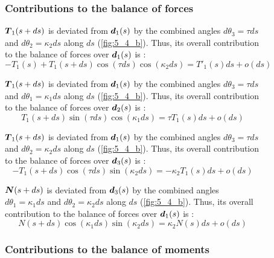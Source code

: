\begin{figure}[p]
	\begin{fullpage}
	\subsubsection{Contributions to the balance of forces}
	\vspace{10pt}
	
	$\boldsymbol{T}_1(s+ds)$ is deviated from $\boldsymbol{d}_1(s)$ by the combined angles $d\theta_3 = \tau ds$ and $d\theta_2 = \kappa_2 ds$ along $ds$ (\cref{fig:5_4_b}). Thus, its overall contribution to the balance of forces over $\boldsymbol{d}_1(s)$ is : 
	\begin{equation*}
		-T_1(s) + T_1(s+ds) \cos(\tau ds) \cos(\kappa_2 ds) = T'_1 (s) ds + o(ds)
	\end{equation*}
	
	$\boldsymbol{T}_1(s+ds)$ is deviated from $\boldsymbol{d}_1(s)$ by the combined angles $d\theta_3 = \tau ds$ and $d\theta_1 = \kappa_1 ds$ along $ds$ (\cref{fig:5_4_b}). Thus, its overall contribution to the balance of forces over $\boldsymbol{d}_2(s)$ is : 
	\begin{equation*}
		T_1(s+ds) \sin(\tau ds) \cos(\kappa_1 ds) = \tau T_1 (s) ds + o(ds)
	\end{equation*}	
	
	$\boldsymbol{T}_1(s+ds)$ is deviated from $\boldsymbol{d}_1(s)$ by the combined angles $d\theta_3 = \tau ds$ and $d\theta_2 = \kappa_2 ds$ along $ds$ (\cref{fig:5_4_b}). Thus, its overall contribution to the balance of forces over $\boldsymbol{d}_3(s)$ is : 
	\begin{equation*}
		-T_1(s+ds) \cos(\tau ds) \sin(\kappa_2 ds) = - \kappa_2 T_1(s) ds + o(ds)
	\end{equation*}	
	
	$\boldsymbol{N}(s+ds)$ is deviated from $\boldsymbol{d}_3(s)$ by the combined angles $d\theta_1 = \kappa_1 ds$ and $d\theta_2 = \kappa_2 ds$ along $ds$ (\cref{fig:5_4_b}). Thus, its overall contribution to the balance of forces over $\boldsymbol{d}_1(s)$ is : 
	\begin{equation*}
		N(s+ds) \cos(\kappa_1 ds) \sin(\kappa_2 ds) = \kappa_2 N(s) ds + o(ds)
	\end{equation*}	
	\vspace{10pt}
	
	\subsubsection{Contributions to the balance of moments}
	\vspace{10pt}
	

\end{fullpage}
\end{figure}
